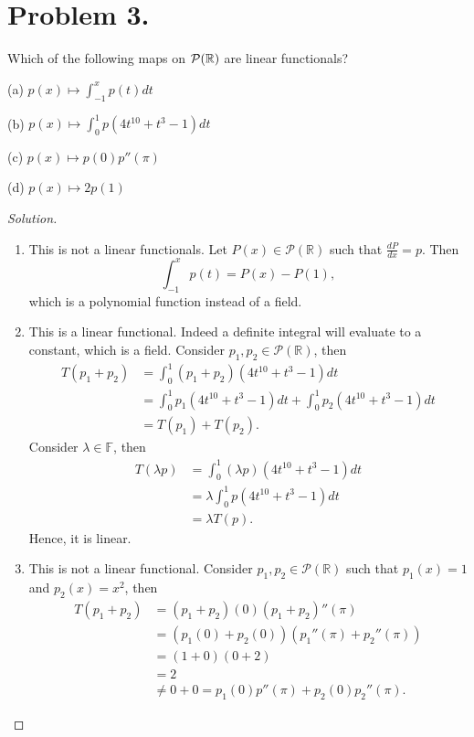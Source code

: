 \documentclass{article}
\begin{document}
\newpage
\section*{Problem 3.}
Which of the following maps on ${\cal P}(\mathbb{R})$ are linear functionals?\smallskip
 
 (a) $p(x)\mapsto \int_{-1}^{x} p(t) dt$\smallskip
 
 (b) $p(x)\mapsto \int_{0}^1 p(4t^{10}+t^3-1) dt$\smallskip
 
 (c) $p(x)\mapsto p(0)p''(\pi)$\smallskip
 
 (d) $p(x) \mapsto 2p(1)$
\begin{proof}[Solution]\indent
    \begin{enumerate}[label=(\alph*)]
        \item This is not a linear functionals. Let $P(x)\in\mathcal{P}(\mathbb{R})$ such that $\frac{dP}{dx}
        = p$. Then $$\int_{-1}^{x}p(t) = P(x)-P(1),$$ which is a polynomial function instead of a 
        field. 

        \item
        This is a linear functional. Indeed a definite integral will evaluate to a constant, which is 
        a field. Consider $p_1, p_2\in\mathcal{P}(\mathbb{R})$, then
        \begin{align*}
            T(p_1+p_2) & = \int_{0}^1 (p_1+p_2)(4t^{10}+t^3-1) dt \\
            & = \int_{0}^1 p_1(4t^{10}+t^3-1) dt + \int_{0}^1 p_2(4t^{10}+t^3-1) dt \\
            & = T(p_1) + T(p_2).
        \end{align*}
        Consider $\lambda\in\mathbb{F}$, then
        \begin{align*}
            T(\lambda p) & = \int_{0}^1 (\lambda p)(4t^{10}+t^3-1) dt \\
            & = \lambda \int_{0}^1 p(4t^{10}+t^3-1) dt \\
            & = \lambda T(p).
        \end{align*}
        Hence, it is linear.

        \item
        This is not a linear functional. Consider $p_1, p_2\in\mathcal{P}(\mathbb{R})$ such that
        $p_1(x)=1$ and $p_2(x)=x^2$, then
        \begin{align*}
            T(p_1+p_2) & = (p_1+p_2)(0)(p_1+p_2)''(\pi) \\
            & = \left(p_1(0)+p_2(0)\right)(p_1''(\pi)+p_2''(\pi)) \\
            & = (1+0)(0+2) \\
            & = 2 \\
            & \neq 0 + 0 = p_1(0)p''(\pi) + p_2(0)p_2''(\pi).
        \end{align*}


\end{enumerate}
\end{proof}
\end{document}
